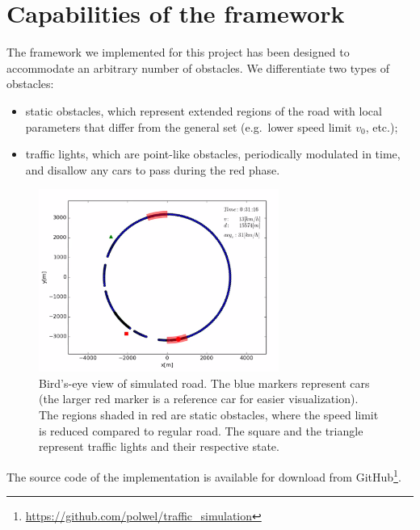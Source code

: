 \appendix 
{}
\section{Capabilities of the framework}
The framework we implemented for this project has been designed to accommodate an arbitrary number of obstacles. We differentiate two types of obstacles:

\begin{itemize}
    \item static obstacles, which represent extended regions of the road with local parameters that differ from the general set (e.g.\ lower speed limit $v_0$, etc.);
    \item traffic lights, which are point-like obstacles, periodically modulated in time, and disallow any cars to pass during the red phase.
\end{itemize}

\begin{figure}[h!]
    \centering
    \includegraphics[width=0.7\textwidth]{../img/traffic_light.png}
    \caption{Bird's-eye view of simulated road. The blue markers represent cars (the larger red marker is a reference car for easier visualization). The regions shaded in red are static obstacles, where the speed limit is reduced compared to regular road. The square and the triangle represent traffic lights and their respective state.}
\end{figure}

\noindent The source code of the implementation is available for download from GitHub\footnote{ \url{https://github.com/polwel/traffic_simulation}}.

